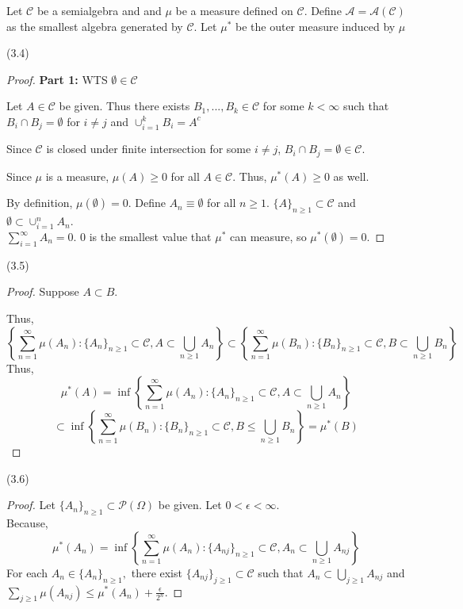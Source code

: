 \documentclass[12pt,letterpaper, onecolumn]{exam}
\newcommand{\power}{\mathcal{P}}
\newcommand{\calA}{\mathcal{A}}
\newcommand{\calC}{\mathcal{C}}
\newcommand{\om}{\mu^*} %
\begin{document}
\begin{questions}
    \begin{solution}

    Let $\calC$ be a semialgebra and and $\mu$ be a measure defined on $\calC$. Define $\calA = \calA(\calC)$ as the smallest algebra generated by $\calC$. Let $\om$ be the outer measure induced by $\mu$

    (3.4)
        \begin{proof}
            \textbf{Part 1:} WTS $\emptyset \in \calC$

            Let $A \in \calC$ be given. Thus there exists $B_1, ... , B_k \in \calC$ for some $k < \infty$ such that $B_i \cap B_j = \emptyset$ for $i \neq j$ and $\cup_{i = 1}^k B_i = A^c$

            Since $\calC$ is closed under finite intersection for some $i \neq j$, $B_i \cap B_j = \emptyset \in \calC$. 

            Since $\mu$ is a measure, $\mu(A) \geq 0$ for all $A \in \calC$. Thus, $\om(A) \geq 0$ as well. 

            By definition, $\mu(\emptyset) = 0$. Define $A_n \equiv \emptyset$ for all $n \geq 1$. $\{A\}_{n \geq 1} \subset \calC$ and $\emptyset \subset \cup_{i = 1}^n A_n$. \\
            $\sum_{i = 1}^\infty A_n = 0$. 0 is the smallest value that $\om$ can measure, so $\om(\emptyset) = 0$.
        \end{proof}
    (3.5)
        \begin{proof}
        Suppose $A \subset B$.

        Thus, 
        \[\left\{\sum_{n = 1}^\infty \mu(A_n): \{A_n\}_{n \geq 1} \subset \calC, A \subset \bigcup_{n \geq 1} A_n\right\} \subset \left\{\sum_{n = 1}^\infty \mu(B_n): \{B_n\}_{n \geq 1} \subset \calC, B \subset \bigcup_{n \geq 1} B_n\right\}\]
        Thus, 
        \[\om(A) = \inf\left\{\sum_{n = 1}^\infty \mu(A_n): \{A_n\}_{n \geq 1} \subset \calC, A \subset \bigcup_{n \geq 1} A_n\right\}\]
        \[\subset \inf\left\{\sum_{n = 1}^\infty \mu(B_n): \{B_n\}_{n \geq 1} \subset \calC, B \leq \bigcup_{n \geq 1} B_n\right\} = \om(B)\]
        \end{proof}
\end{solution}
\newpage 
\begin{solution}
    (3.6)
        \begin{proof}
            Let $\{A_n\}_{n \geq 1} \subset \power(\Omega)$ be given. Let $0 < \epsilon < \infty$. \\
            Because, 
            \[\mu^*(A_n) = \inf\left\{\sum_{n = 1}^\infty \mu(A_n): \{A_{nj}\}_{n \geq 1} \subset \calC, A_n \subset \bigcup_{n \geq 1} A_{nj}\right\}\]
        For each $A_n \in \{A_n\}_{n \geq 1},$ there exist $\{A_{nj}\}_{j \geq 1} \subset \calC$ such that $A_n \subset \bigcup_{j \geq 1} A_{nj}$ and $\sum_{j \geq 1}\mu(A_{nj}) \leq \om(A_n) + \frac{\epsilon}{2^n}$.


\end{proof}
\end{solution}
\end{questions}
\end{document}
